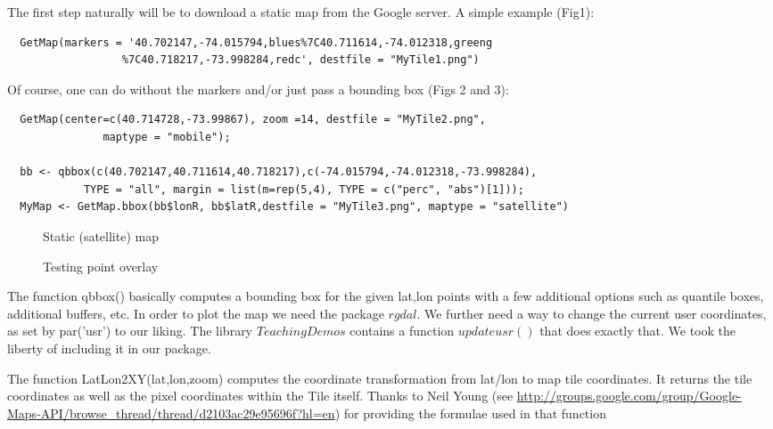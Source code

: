\documentclass{article}
\begin{document}
\noindent The first step naturally will be to download a static map from the Google server. A simple example (Fig1):
\begin{verbatim}
  GetMap(markers = '40.702147,-74.015794,blues%7C40.711614,-74.012318,greeng
                  %7C40.718217,-73.998284,redc', destfile = "MyTile1.png")
\end{verbatim}
Of course, one can do without the markers and/or just pass a bounding box (Figs 2 and 3):
\begin{verbatim}
  GetMap(center=c(40.714728,-73.99867), zoom =14, destfile = "MyTile2.png",
               maptype = "mobile");
  
  bb <- qbbox(c(40.702147,40.711614,40.718217),c(-74.015794,-74.012318,-73.998284), 
            TYPE = "all", margin = list(m=rep(5,4), TYPE = c("perc", "abs")[1]));
  MyMap <- GetMap.bbox(bb$lonR, bb$latR,destfile = "MyTile3.png", maptype = "satellite")
\end{verbatim}

\begin{figure}[thb]
  \begin{minipage}[b]{0.5\linewidth}
\centering
    \caption{Static (satellite) map}
  \end{minipage}
  \begin{minipage}[b]{0.5\linewidth}
\centering
{}
    \caption{Testing point overlay}
\end{minipage}
\end{figure}


\noindent The function qbbox() basically computes a bounding box for the given lat,lon points with a few additional options such as quantile boxes, additional buffers, etc.
In order to plot the map we need the package $rgdal$.
We further need a way to change the current user coordinates, as set by par('usr') to our liking. The library $TeachingDemos$ contains a function $updateusr()$ that does exactly that. We took the liberty of including it in our package.

\noindent The function LatLon2XY(lat,lon,zoom) computes the coordinate transformation from lat/lon to map tile coordinates. 
It returns the tile coordinates as well as the pixel coordinates within the Tile itself.
Thanks to Neil Young (see \url{http://groups.google.com/group/Google-Maps-API/browse_thread/thread/d2103ac29e95696f?hl=en}) for providing the formulae used in that function
\end{document}
